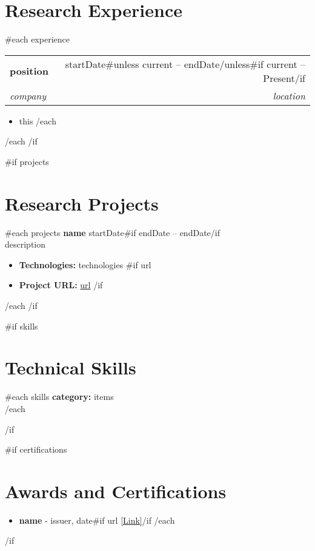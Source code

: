 \documentclass[11pt,letterpaper]{article}
\makeatletter
\newcommand{\resitem}[1]{\item #1 \vspace{-2pt}}
\newcommand{\ressubheading}[4]{
\begin{tabular*}{7.0in}{l@{\extracolsep{\fill}}r}
		\textbf{#1} & #2 \\
		\textit{#3} & \textit{#4} \\
\end{tabular*}\vspace{-6pt}}
\makeatother
\begin{document}
\section{Research Experience}
{{#each experience}}
\ressubheading{{{position}}}{{{startDate}}{{#unless current}} -- {{endDate}}{{/unless}}{{#if current}} -- Present{{/if}}}{{{company}}}{{{location}}}
\begin{itemize}
{{#each description}}
\resitem{{{this}}}
{{/each}}
\end{itemize}
\vspace{5pt}
{{/each}}
{{/if}}

{{#if projects}}
\section{Research Projects}
{{#each projects}}
\textbf{{{name}}} \hfill {{startDate}}{{#if endDate}} -- {{endDate}}{{/if}}\\
{{description}}
\begin{itemize}
\resitem{\textbf{Technologies:} {{technologies}}}
{{#if url}}
\resitem{\textbf{Project URL:} \href{{{url}}}{{{url}}}}
{{/if}}
\end{itemize}
\vspace{5pt}
{{/each}}
{{/if}}

{{#if skills}}
\section{Technical Skills}
\begin{multicols}{2}
{{#each skills}}
\textbf{{{category}}:} {{items}}\\
{{/each}}
\end{multicols}
{{/if}}

{{#if certifications}}
\section{Awards and Certifications}
\begin{itemize}
{{#each certifications}}
\resitem{\textbf{{{name}}} - {{issuer}}, {{date}}{{#if url}} \href{{{url}}}{[Link]}{{/if}}}
{{/each}}
\end{itemize}
{{/if}}
\end{document}
